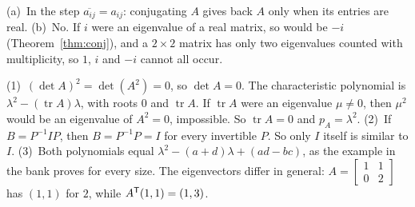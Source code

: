 \documentclass[11pt]{article}
\begin{document}
\begin{description}[leftmargin=0pt,itemsep=5pt]
  \item[Pause and think \ref{think:conjpair}.] (a)~In the step $\overline{a_{ij}}=a_{ij}$: conjugating $A$ gives back $A$ only when its entries are real. (b)~No. If $i$ were an eigenvalue of a real matrix, so would be $-i$ (Theorem~\ref{thm:conj}), and a $2\times2$ matrix has only two eigenvalues counted with multiplicity, so $1$, $i$ and $-i$ cannot all occur.
  \item[Questions to think about.] (1)~$(\det A)^2=\det(A^2)=0$, so $\det A=0$. The characteristic polynomial is $\lambda^2-(\operatorname{tr}A)\lambda$, with roots $0$ and $\operatorname{tr}A$. If $\operatorname{tr}A$ were an eigenvalue $\mu\neq0$, then $\mu^2$ would be an eigenvalue of $A^2=0$, impossible. So $\operatorname{tr}A=0$ and $p_A=\lambda^2$. (2)~If $B=P^{-1}IP$, then $B=P^{-1}P=I$ for every invertible $P$. So only $I$ itself is similar to $I$. (3)~Both polynomials equal $\lambda^2-(a+d)\lambda+(ad-bc)$, as the example in the bank proves for every size. The eigenvectors differ in general: $A=\begin{bmatrix}1&1\\0&2\end{bmatrix}$ has $(1,1)$ for $2$, while $A^{\mathsf T}(1,1)=(1,3)$.
\end{description}
\end{document}
